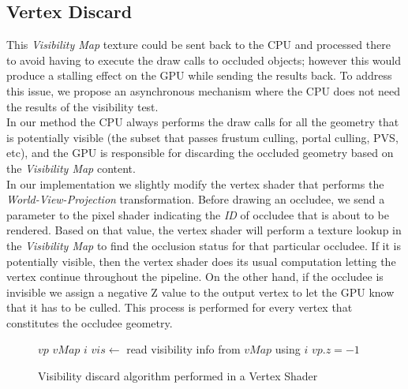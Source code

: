 \documentclass[10pt, conference]{IEEEtran}
\begin{document}
\subsection{Vertex Discard}
%
This \emph{Visibility Map} texture could be sent back to the CPU and processed there to avoid having to execute the draw calls to occluded objects; 
however this would produce a stalling effect on the GPU while sending the results back. 
To address this issue, we propose an asynchronous mechanism where the CPU does not need the results of the visibility test.\\

In our method the CPU always performs the draw calls for all the geometry that is potentially visible 
(the subset that passes frustum culling, portal culling, PVS, etc), and the GPU is responsible for discarding the occluded geometry based 
on the \emph{Visibility Map} content.\\

In our implementation we slightly modify the vertex shader that performs the \emph{World-View-Projection} transformation. 
Before drawing an occludee, we send a parameter to the pixel shader indicating the \emph{ID} of occludee that is about to be rendered. 
Based on that value, the vertex shader will perform a texture lookup in the \emph{Visibility Map} to find the occlusion status for that particular occludee. 
If it is potentially visible, then the vertex shader does its usual computation letting the vertex continue throughout the pipeline. 
On the other hand, if the occludee is invisible we assign a negative Z value to the output vertex to let the GPU know that it has to be culled. 
This process is performed for every vertex that constitutes the occludee geometry.

\begin{figure}[!hbp]
	\begin{algorithmic}[1]
		\REQUIRE $vp$ 
		\REQUIRE $vMap$ 
		\REQUIRE $i$ 
		\STATE $vis \leftarrow$ read visibility info from $vMap$ using $i$
			\STATE {}
		\ELSE
			\STATE $vp.z = -1$ 
		\ENDIF
	\end{algorithmic}
	\caption{Visibility discard algorithm performed in a Vertex Shader}
\end{figure}





\end{document}
